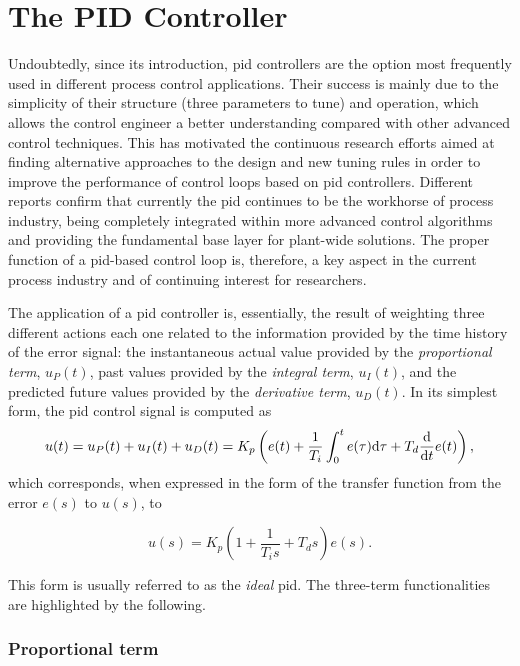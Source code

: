 \section{The PID Controller}
\label{sec:3}
Undoubtedly, since its introduction, \gls{pid} controllers are the option most frequently used in different process control applications. Their success is mainly due to the simplicity of their structure (three parameters to tune) and operation, which allows the control engineer a better understanding compared with other advanced control techniques. This has motivated the continuous research efforts aimed at finding alternative approaches to the design and new tuning rules in order to improve the performance of control loops based on \gls{pid} controllers. Different reports confirm that currently the \gls{pid} continues to be the workhorse of process industry, being completely integrated within more advanced control algorithms and providing the fundamental base layer for plant-wide solutions. The proper function of a \gls{pid}-based control loop is, therefore, a key aspect in the current process industry and of continuing interest for researchers.

The application of a \gls{pid} controller is, essentially, the result of weighting three different actions each one related to the information provided by the time history of the error signal: the instantaneous actual value provided by the  \emph{proportional term}, $u_P(t)$, past values provided by the \emph{integral term}, $u_I(t)$, and the predicted future values provided by the \emph{derivative term}, $u_D(t)$.  In its simplest form, the \gls{pid} control signal is computed as
%
\begin{equation}
u(t)=u_P(t)+u_I(t)+u_D(t)= K_p \left ( e(t)+\frac{1}{T_i}\int_0^t e(\tau)\mathrm{d} \tau+T_d\frac{\mathrm{d}}{\mathrm{d} t}e(t) \right ),
\end{equation}
%
which corresponds, when expressed in the form of the transfer function from the error $e(s)$ to $u(s)$, to

\begin{equation}
u(s)=K_p \left ( 1+\frac{1}{T_is}+{T_ds} \right )  e(s).
\label{Ch2eq:PID_ideal}
\end{equation}

This form is usually referred to as the \emph{ideal} \gls{pid}. The three-term functionalities are highlighted by the following.

\subsubsection*{Proportional term}

